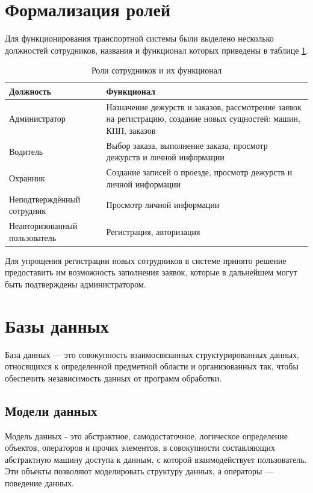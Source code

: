 \section{Формализация ролей}
Для функционирования транспортной системы были выделено несколько должностей сотрудников, названия и функционал которых приведены в таблице \ref{role_table}.

\begin{table}[h] 
	\caption{Роли сотрудников и их функционал}
	\label{role_table}
	\begin{tabular}{| p{4.5cm} | p{9.7cm} |}
		\hline
		\textbf{Должность}		&	\textbf{Функционал} \\
		\hline
		Администратор			&	
		Назначение дежурств и заказов, рассмотрение заявок на регистрацию, создание новых сущностей: машин, КПП, заказов  \\
		\hline
		
		Водитель &
		Выбор заказа, выполнение заказа, просмотр дежурств и личной информации \\
		\hline
		
		Охранник &
		Создание записей о проезде, просмотр дежурств и личной информации \\
		\hline
		
		Неподтверждённый сотрудник &
		Просмотр личной информации  \\	
		\hline	
		
		Неавторизованный пользователь &
		Регистрация, авторизация  \\		
		\hline
	\end{tabular}
\end{table}

Для упрощения регистрации новых сотрудников в системе принято решение предоставить им возможность заполнения заявок, которые в дальнейшем могут быть подтверждены администратором.

\section{Базы данных}
База данных — это совокупность взаимосвязанных структурированных данных, относящихся к определенной предметной области и организованных так, чтобы обеспечить независимость данных от программ обработки. \cite{db_model}

\subsection{Модели данных}
Модель данных - это абстрактное, самодостаточное, логическое определение объектов, операторов и прочих элементов, в совокупности составляющих абстрактную машину доступа к данным, с которой взаимодействует пользователь. Эти объекты позволяют моделировать
структуру данных, а операторы — поведение данных.
\cite{db_model2}

